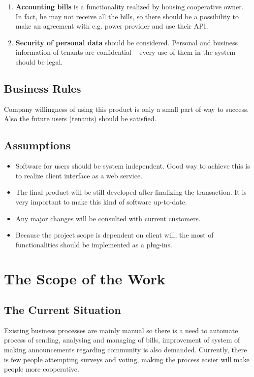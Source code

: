 \documentclass[a4paper,11pt,onecolumn,oneside]{book}
\begin{document}
\begin{enumerate}
\item \textbf{Accounting bills} is a functionality realized by housing cooperative owner. In fact, he may not receive all the bills, so there should be a possibility to make an agreement with e.g. power provider and use their API.
\item \textbf{Security of personal data} should be considered. Personal and business information of tenants are confidential – every use of them in the system should be legal.
\end{enumerate}

\subsection{Business Rules}

Company willingness of using this product is only a small part of way to success. Also the future users (tenants) should be satisfied.

\subsection{Assumptions}

\begin{itemize}
\item  Software for users should be system independent. Good way to achieve this is to realize client interface as a web service.
\item The final product will be still developed after finalizing the transaction. It is very important to make this kind of software up-to-date.
\item Any major changes will be consulted with current customers.
\item Because the project scope is dependent on client will, the most of functionalities should be implemented as a plug-ins.


\end{itemize}

\section{The Scope of the Work}
\subsection{The Current Situation}

Existing business processes are mainly manual so there is a need 
to automate process of sending, analysing and managing of bills, 
improvement of system of making announcements regarding community is 
also demanded. Currently, there is few people attempting surveys and 
voting, making the process easier will make people more cooperative.
\end{document}
